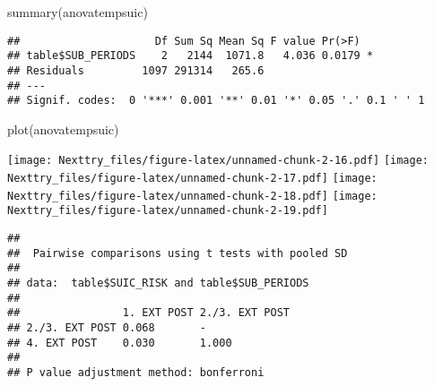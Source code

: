 \documentclass[
]{book}
\newenvironment{Shaded}{\begin{snugshade}}{\end{snugshade}}
\newcommand{\AttributeTok}[1]{\textcolor[rgb]{0.77,0.63,0.00}{#1}}
\newcommand{\CommentTok}[1]{\textcolor[rgb]{0.56,0.35,0.01}{\textit{#1}}}
\newcommand{\ConstantTok}[1]{\textcolor[rgb]{0.00,0.00,0.00}{#1}}
\newcommand{\FunctionTok}[1]{\textcolor[rgb]{0.00,0.00,0.00}{#1}}
\newcommand{\NormalTok}[1]{#1}
\newcommand{\SpecialCharTok}[1]{\textcolor[rgb]{0.00,0.00,0.00}{#1}}
\newcommand{\StringTok}[1]{\textcolor[rgb]{0.31,0.60,0.02}{#1}}
\begin{document}
\begin{Shaded}
\begin{Highlighting}[]
\FunctionTok{summary}\NormalTok{(anovatempsuic)}
\end{Highlighting}
\end{Shaded}

\begin{verbatim}
##                     Df Sum Sq Mean Sq F value Pr(>F)  
## table$SUB_PERIODS    2   2144  1071.8   4.036 0.0179 *
## Residuals         1097 291314   265.6                 
## ---
## Signif. codes:  0 '***' 0.001 '**' 0.01 '*' 0.05 '.' 0.1 ' ' 1
\end{verbatim}

\begin{Shaded}
\begin{Highlighting}[]
\FunctionTok{plot}\NormalTok{(anovatempsuic)}
\end{Highlighting}
\end{Shaded}

\texttt{[image: Nexttry\_files/figure-latex/unnamed-chunk-2-16.pdf]} \texttt{[image: Nexttry\_files/figure-latex/unnamed-chunk-2-17.pdf]} \texttt{[image: Nexttry\_files/figure-latex/unnamed-chunk-2-18.pdf]} \texttt{[image: Nexttry\_files/figure-latex/unnamed-chunk-2-19.pdf]}

\begin{Shaded}
\end{Shaded}

\begin{verbatim}
## 
##  Pairwise comparisons using t tests with pooled SD 
## 
## data:  table$SUIC_RISK and table$SUB_PERIODS 
## 
##                1. EXT POST 2./3. EXT POST
## 2./3. EXT POST 0.068       -             
## 4. EXT POST    0.030       1.000         
## 
## P value adjustment method: bonferroni
\end{verbatim}

\begin{Shaded}
\end{Shaded}
\end{document}
